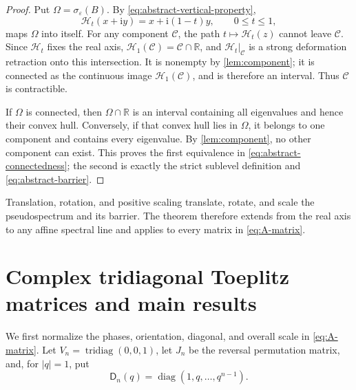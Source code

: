 \documentclass[10pt,twoside]{siamart1116}
\numberwithin{equation}{section}
\DeclareMathOperator{\diag}{diag}
\DeclareMathOperator{\tridiag}{tridiag}
\newcommand{\R}{\mathbb R}
\newcommand{\ii}{\mathrm i}
\begin{document}
\begin{proof}
Put \(\Omega=\sigma_\varepsilon(B)\).  By
\eqref{eq:abstract-vertical-property},
\[
 \mathcal H_t(x+\ii y)=x+\ii(1-t)y,
 \qquad 0\leq t\leq1,
\]
maps \(\Omega\) into itself.  For any component \(\mathcal C\), the path
\(t\mapsto\mathcal H_t(z)\) cannot leave \(\mathcal C\).  Since
\(\mathcal H_t\) fixes the real axis,
\(\mathcal H_1(\mathcal C)=\mathcal C\cap\R\), and
\(\mathcal H_t|_{\mathcal C}\) is a strong deformation retraction onto this
intersection.  It is nonempty by
\cref{lem:component}; it is connected as the continuous image
\(\mathcal H_1(\mathcal C)\), and is therefore an interval.  Thus
\(\mathcal C\) is contractible.

If \(\Omega\) is connected, then \(\Omega\cap\R\) is an interval containing
all eigenvalues and hence their convex hull.  Conversely, if that convex
hull lies in \(\Omega\), it belongs to one component and contains every
eigenvalue.  By \cref{lem:component}, no other component can exist.  This
proves the first equivalence in \eqref{eq:abstract-connectedness}; the second
is exactly the strict sublevel definition and \eqref{eq:abstract-barrier}.
\end{proof}

Translation, rotation, and positive scaling translate, rotate, and scale the
pseudospectrum and its barrier.  The theorem therefore extends from the real
axis to any affine spectral line and applies to every matrix in
\eqref{eq:A-matrix}.

\section{Complex tridiagonal Toeplitz matrices and main results}
\label{sec:main-results}

We first normalize the phases, orientation, diagonal, and overall scale in
\eqref{eq:A-matrix}.  Let
\(V_n=\tridiag(0,0,1)\), let \(J_n\) be the reversal permutation matrix,
and, for \(|q|=1\), put
\[
 \mathsf D_n(q)=\diag(1,q,\ldots,q^{n-1}).
\]

\end{document}
